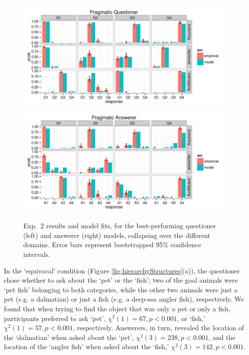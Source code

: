 \documentclass[12pt, floatsintext, jou]{apa6}
\begin{document}

\begin{figure}[t!]
\begin{center}
\includegraphics[scale = .75]{Exp2QuestResults}
\includegraphics[scale = .75]{Exp2AnsResults}
\end{center}
\caption{Exp.~2 results and model fits, for the best-performing questioner (left) and answerer (right) models, collapsing over the different domains. Error bars represent bootstrapped 95\% confidence intervals.}
\label{fig:exp4res}
\end{figure}
In the `equivocal' condition (Figure \ref{fig:hierarchyStructures}(a)), the questioner chose whether to ask about the `pet' or the `fish'; two of the goal animals were `pet fish' belonging to both categories, while the other two animals were just a pet (e.g. a dalmatian) or just a fish (e.g. a deep-sea angler fish), respectively. We found that when trying to find the object that was only a pet or only a fish, participants preferred to ask `pet', $\chi^2(1) = 67, p < 0.001$, or `fish,' $\chi^2(1) = 57, p < 0.001$, respectively. Answerers, in turn, revealed the location of the `dalmatian' when asked about the `pet', $\chi^2(3) = 238, p < 0.001$, and the location of the `angler fish' when asked about the `fish,' $\chi^2(3) = 142, p < 0.001$. 
\end{document}
